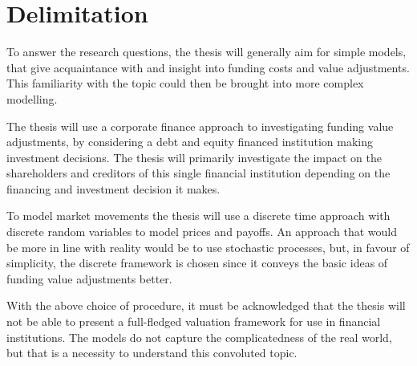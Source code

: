 \documentclass[main.tex]{subfiles}
\begin{document}
    \section{Delimitation}

    To answer the research questions, the thesis will generally aim for simple models,
    that give acquaintance with and insight into funding costs and value adjustments.
    This familiarity with the topic could then be brought into more complex modelling.

    The thesis will use a corporate finance approach to investigating funding value adjustments,
    by considering a debt and equity financed institution making investment decisions.
    The thesis will primarily investigate the impact on the shareholders and creditors 
    of this single financial institution depending on the financing and investment decision it makes.

    To model market movements the thesis will use a discrete time approach 
    with discrete random variables to model prices and payoffs.
    An approach that would be more in line with reality would be to use stochastic processes,
    but, in favour of simplicity, the discrete framework is chosen 
    since it conveys the basic ideas of funding value adjustments better.

    With the above choice of procedure, it must be acknowledged that the thesis will not be able to
    present a full-fledged valuation framework for use in financial institutions.
    The models do not capture the complicatedness of the real world,
    but that is a necessity to understand this convoluted topic.
\end{document}
